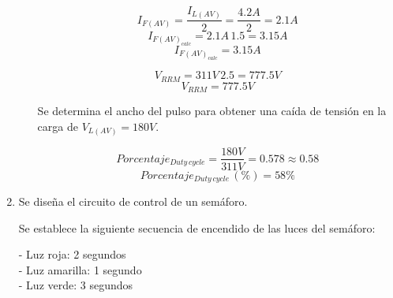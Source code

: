 \documentclass{article}
\begin{document}
\begin{enumerate}
\begin{enumerate}[label=\alph*.]
$$ I_{F(AV)}= \frac{I_{L(AV)}}{2}= \frac{4.2A}{2}= 2.1A $$
$$ I_{F(AV)_{calc}}= 2.1A \, 1.5= 3.15A $$
$$ \boxed{ I_{F(AV)_{calc}}= 3.15A } $$

$$ V_{RRM}= 311V \, 2.5= 777.5V $$
$$ \boxed{ V_{RRM}= 777.5V } $$

Se determina el ancho del pulso para obtener una caída de tensión en la carga de $ V_{L(AV)}= 180V $.

$$ Porcentaje_{Duty \, cycle}= \frac{180V}{311V}= 0.578 \approx 0.58 $$
$$ \boxed{ Porcentaje_{Duty \, cycle} \, (\%)= 58\% } $$







\end{enumerate}

\item Se diseña el circuito de control de un semáforo.

Se establece la siguiente secuencia de encendido de las luces del semáforo:

- Luz roja: 2 segundos \\  
- Luz amarilla: 1 segundo \\
- Luz verde: 3 segundos 

\end{enumerate}
\end{document}
